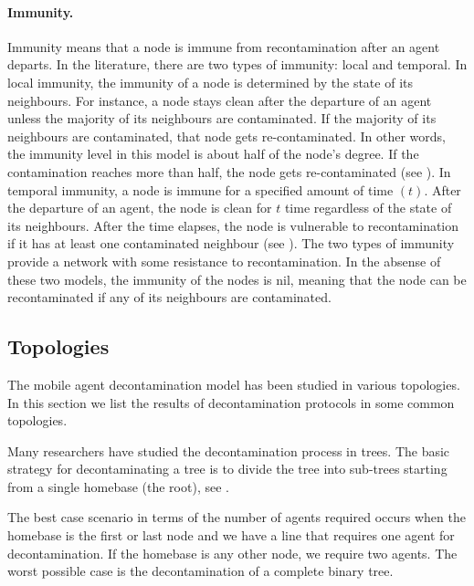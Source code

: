 \paragraph{ Immunity.}
Immunity means that a node is immune from recontamination after an agent departs. In the literature, there are two types of immunity: local and temporal. In local immunity, the immunity of a node is determined by the state of its neighbours. For instance, a node stays clean after the departure of an agent unless the majority of its neighbours are contaminated. If the majority of its neighbours are contaminated, that node gets re-contaminated. In other words, the immunity level in this model is about half of the node’s degree. If the contamination reaches more than half, the node gets re-contaminated (see \cite{lucetal22,floc21}). In temporal immunity, a node is immune for a specified amount of time $(t)$. After the departure of an agent, the node is clean for $t$ time regardless of the state of its neighbours. After the time elapses, the node is vulnerable to recontamination if it has at least one contaminated neighbour (see \cite{floetal13}). The two types of immunity provide a network with some resistance to recontamination.  In the absense of these two models, the immunity of the nodes is nil, meaning that the node can be recontaminated if any of its neighbours are contaminated.



\subsection{Topologies}

The mobile agent decontamination model has been studied in various topologies. In this section we list the results of decontamination protocols in some common topologies.

 
Many researchers have studied the decontamination process in trees. The basic strategy for decontaminating a tree is to divide the tree into sub-trees starting from a single homebase (the root), see \cite{floetal13,lucetal22}. 

The best case scenario in terms of the number of agents required occurs when the homebase is the first or last node and we have a line that requires one agent for decontamination. If the homebase is any other node, we require two agents. The worst possible case is the decontamination of a complete binary tree.


